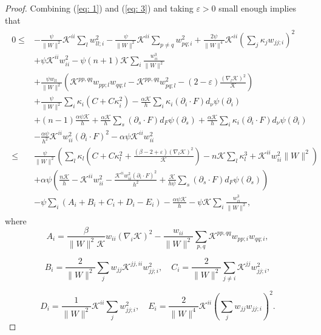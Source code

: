 \documentclass{amsart}
\theoremstyle{definition}
\theoremstyle{remark}
\numberwithin{equation}{section}
\begin{document}
\begin{proof}
Combining  (\ref{eq: 1}) and (\ref{eq: 3}) and taking $\varepsilon>0$ small enough implies that
\begin{align}\begin{split}\label{eq:L10-1}
0\leq& -\frac{\psi}{\|W\|^2}\mathcal{K}^{ii}\sum_lw_{ll;i}^2-\frac{\psi}{\|W\|^2}\mathcal{K}^{ii}\sum_{p\ne q}w_{pq;i}^2
+\frac{2\psi}{\|W\|^4}\mathcal{K}^{ii}\left(\sum_j\kappa_jw_{jj;i}\right)^2\\
&+\psi\mathcal{K}^{ii}w_{ii}^2-\psi(n+1)\mathcal{K}\sum_i\frac{w_{ii}^3}{\|W\|^2}\\
&+\frac{\psi w_{ll}}{\|W\|^2}\left(\mathcal{K}^{pp,qq}w_{pp;l}w_{qq;l}-\mathcal{K}^{pp,qq}w_{pq;l}^2
-(2-\varepsilon)\frac{(\nabla_l\mathcal{K})^2}{\mathcal{K}}\right)\\
&+\frac{\psi}{\|W\|^2}\sum_i \kappa_i(C+C\kappa_i^2)-\frac{\alpha\mathcal{K}}{h}\sum_i \kappa_i(\partial_i\cdot F) d_{\nu}\psi(\partial_i)\\
&+(n-1)\frac{\alpha\psi\mathcal{K}}{h}+\frac{\alpha\mathcal{K}}{h}\sum_s(\partial_s\cdot F) d_F\psi(\partial_s)+\frac{\alpha\mathcal{K}}{h}\sum_i\kappa_i(\partial_i\cdot F) d_{\nu}\psi(\partial_i)\\
&-\frac{\alpha\psi}{h^2}\mathcal{K}^{ii}w_{ii}^2(\partial_i\cdot F)^2 -\alpha\psi\mathcal{K}^{ii}w_{ii}^2\\
\leq&\frac{\psi}{\|W\|^2}\left(\sum_l\kappa_l\left(C+C\kappa_l^2+\frac{(\beta
-2+\varepsilon)(\nabla_l\mathcal{K})^2}{\mathcal{K}}\right)-n\mathcal{K}\sum_l\kappa_l^3+\mathcal{K}^{ii}w_{ii}^2\|W\|^2\right)\\
&+\alpha\psi\left(\frac{n\mathcal{K}}{h}-\mathcal{K}^{ii}w_{ii}^2-\frac{\mathcal{K}^{ii}w_{ii}^2(\partial_i\cdot F)^2}{h^2}+\frac{\mathcal{K}}{h\psi}\sum_s(\partial_s\cdot F) d_F\psi(\partial_s)\right)\\
&-\psi\sum_i\left(A_i+B_i+C_i+D_i-E_i\right)
-\frac{\alpha\psi\mathcal{K}}{h}-\psi\mathcal{K}\sum_i\frac{w_{ii}^3}{\|W\|^2},
\end{split}\end{align}
where
\[A_i=\frac{\beta}{\|W\|^2\mathcal{K}} w_{ii}(\nabla_i\mathcal{K})^2-\frac{w_{ii}}{\|W\|^2}\sum_{p,q}\mathcal{K}^{pp,qq}w_{pp;i}w_{qq;i},\]

\[B_i=\frac{2}{\|W\|^2}\sum_{j}w_{jj}\mathcal{K}^{jj,ii}w^2_{jj;i},\quad C_i=\frac{2}{\|W\|^2}\sum_{j\neq i}\mathcal{K}^{jj}w_{jj;i}^2,\]

\[D_i=\frac{1}{\|W\|^2}\mathcal{K}^{ii}\sum_j w_{jj;i}^2,\quad
E_i=\frac{2}{\|W\|^4}\mathcal{K}^{ii}\left(\sum_j w_{jj}w_{jj;i}\right)^2.\]


\end{proof}
\end{document}
